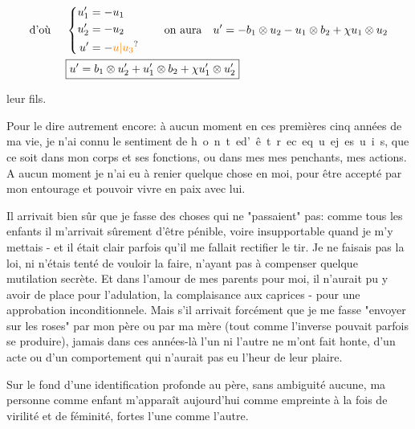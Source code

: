 \[
\begin{aligned}
\text{d'où }\quad&\left\{\begin{aligned}u'_1&=-u_1\\u'_2&=-u_2\\u'&=-\unsure{u|u_3}\end{aligned}\right.
\qquad\text{on aura}\quad u'=-b_1\otimes u_2-u_1\otimes b_2+\chi u_1\otimes u_2\\
&\boxed{u'=b_1\otimes u'_2+u'_1\otimes b_2+\chi u'_1\otimes u'_2}
\end{aligned}
\]




leur fils.

Pour le dire autrement encore: à aucun moment en ces premières\unsure{,} cinq années de ma vie, je n'ai connu le sentiment de \mbox{h o n t e}\quad\mbox{d' ê t r e}\quad\mbox{c e}\quad\mbox{q u e}\quad\mbox{j e}\quad\mbox{s u i s}, que ce soit dans mon corps et ses fonctions, ou dans mes  mes penchants, mes actions. A aucun moment je n'ai eu à renier quelque chose en moi, pour être accepté par mon entourage et pouvoir vivre en paix avec lui.

Il arrivait bien sûr que je fasse des choses qui ne "passaient" pas: comme tous les enfants il m'arrivait sûrement d'être pénible, voire insupportable quand je m'y mettais - et il était clair parfois qu'il me fallait rectifier le tir. Je ne faisais pas la loi, ni n'étais tenté de vouloir la faire, n'ayant pas à compenser quelque mutilation secrète. Et dans l'amour de mes parents pour moi, il n'aurait pu y avoir de place pour l'adulation, la complaisance aux caprices - pour une approbation inconditionnele. Mais s'il arrivait forcément que je me fasse "envoyer sur les roses" par mon père ou par ma mère (tout comme l'inverse pouvait parfois se produire), jamais dans ces années-là l'un ni l'autre ne m'ont fait honte, d'un acte ou d'un comportement qui n'aurait pas eu l'heur de leur plaire.

Sur le fond d'une identification profonde au père, sans ambiguité aucune, ma personne comme enfant m'apparaît aujourd'hui comme empreinte à la fois de virilité et de féminité, fortes l'une comme l'autre.

